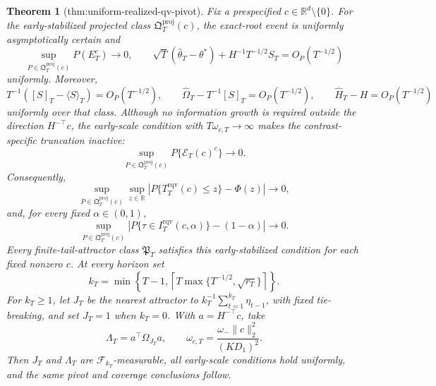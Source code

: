 \documentclass{article}
\newtheorem{theorem}{Theorem}
\begin{document}
\begin{theorem}[thm:uniform-realized-qv-pivot]\label{thm:uniform-realized-qv-pivot}
Fix a prespecified \(c\in\mathbb R^d\setminus\{0\}\). For the early-stabilized projected class \(\mathfrak Q_T^{\mathrm{proj}}(c)\), the exact-root event is uniformly asymptotically certain and
\[
 \sup_{P\in\mathfrak Q_T^{\mathrm{proj}}(c)}P(E_T^c)\longrightarrow0,
 \qquad
 \sqrt T(\widehat\theta_T-\theta^*)+H^{-1}T^{-1/2}S_T
 =O_P(T^{-1/2})
\]
uniformly. Moreover,
\[
 T^{-1}([S]_T-\langle S\rangle_T)=O_P(T^{-1/2}),\qquad
 \widehat\Omega_T-T^{-1}[S]_T=O_P(T^{-1/2}),\qquad
 \widehat H_T-H=O_P(T^{-1/2})
\]
uniformly over that class. Although no information growth is required outside the direction \(H^{-\top}c\), the early-scale condition with \(T\omega_{c,T}\to\infty\) makes the contrast-specific truncation inactive:
\[
 \sup_{P\in\mathfrak Q_T^{\mathrm{proj}}(c)}P\{\mathcal E_T(c)^c\}
 \longrightarrow0.
\]
Consequently,
\[
 \sup_{P\in\mathfrak Q_T^{\mathrm{proj}}(c)}\sup_{z\in\mathbb R}
 \left|P\{T_T^{\mathrm{rqv}}(c)\le z\}-\Phi(z)\right|
 \longrightarrow0,
\]
and, for every fixed \(\alpha\in(0,1)\),
\[
 \sup_{P\in\mathfrak Q_T^{\mathrm{proj}}(c)}
 \left|P\{\tau\in I_T^{\mathrm{rqv}}(c,\alpha)\}-(1-\alpha)\right|
 \longrightarrow0.
\]
Every finite-tail-attractor class \(\mathfrak P_T\) satisfies this early-stabilized condition for each fixed nonzero \(c\). At every horizon set
\[
 k_T=\min\!\left\{T-1,\left\lceil T\max\{T^{-1/2},\sqrt{r_T}\}\right\rceil\right\}.
\]
For \(k_T\ge1\), let \(J_T\) be the nearest attractor to \(k_T^{-1}\sum_{t=1}^{k_T}\eta_{t-1}\), with fixed tie-breaking, and set \(J_T=1\) when \(k_T=0\). With \(a=H^{-\top}c\), take
\[
 \Lambda_T=a^\top\Omega_{J_T}a,\qquad
 \omega_{c,T}=\frac{\omega_-\|c\|_2^2}{(KD_1)^2}.
\]
Then \(J_T\) and \(\Lambda_T\) are \(\mathcal F_{k_T}\)-measurable, all early-scale conditions hold uniformly, and the same pivot and coverage conclusions follow.
\end{theorem}
\end{document}
